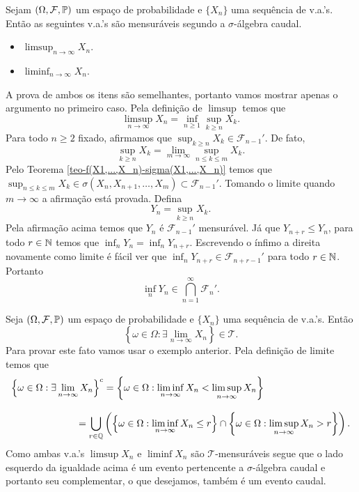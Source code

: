 \begin{exemplo}
	Sejam $(\Omega,\mathcal{F},\mathbb{P})$ um espaço de probabilidade e
	$\{X_n\}$ uma sequência de v.a.'s. Então as seguintes
	v.a.'s são mensuráveis segundo a $\sigma$-álgebra caudal. 
		\begin{itemize}
			\item 
			$\displaystyle \limsup_{n\to\infty} X_n$.
			
			\item
			$\displaystyle \liminf_{n\to\infty} X_n$.
		\end{itemize}		 

A prova de ambos os itens são semelhantes, portanto vamos 
mostrar apenas o argumento no primeiro caso.  
Pela definição de $\limsup$ temos que 
		\[
			\limsup_{n\to\infty} X_n
			=
			\inf_{n\geq 1} \sup_{k\geq n} X_k.
		\]
Para todo $n\geq 2$ fixado, 
afirmamos que $\sup_{k\geq n} X_k\in \mathcal{F}_{n-1}'$.
De fato,  
\[
	\sup_{k\geq n} X_k  
	= 
	\lim_{m\to\infty} \sup_{n\leq k\leq m} X_k.
\]
Pelo Teorema \ref{teo-f(X1,...,X_n)-sigma(X1,...,X_n)} 
temos que  
$\sup_{n\leq k\leq m} X_k
\in 
\sigma(X_n,X_{n+1},\ldots,X_{m})
\subset
\mathcal{F}_{n-1}'$.
Tomando o limite quando $m\to\infty$ a afirmação está provada. 
Defina 
	\[
		Y_{n} = \sup_{k\geq n} X_k.
	\]
Pela afirmação acima temos que $Y_n$ é $\mathcal{F}_{n-1}'$ mensurável.
Já que  $Y_{n+r}\leq Y_n$, para todo $r\in\mathbb{N}$ temos que 
$\inf_{n} Y_{n} = \inf_{n} Y_{n+r}$. Escrevendo o ínfimo 
a direita novamente como limite é fácil ver que 
$\inf_{n} Y_{n+r}\in \mathcal{F}_{n+r-1}'$ para todo 
$r\in\mathbb{N}$. Portanto 
	\[
		\inf_{n} Y_{n}\in 
		\bigcap_{n=1}^{\infty}
		\mathcal{F}_{n}'.
	\]
\end{exemplo}







\begin{exemplo}
	Seja $(\Omega,\mathcal{F},\mathbb{P})$ um espaço de probabilidade e
	$\{X_n\}$ uma sequência de v.a.'s. Então 
		\[
			\left\{
				\omega\in \Omega: 
				\exists \lim_{n\to\infty} X_n
			\right\}
			\in
			\mathcal{T}.
		\]
	Para provar este fato vamos usar o exemplo anterior.
	Pela definição de limite temos que 
	\begin{align*}
		\left\{
			\omega\in \Omega: 
			\exists \lim_{n\to\infty} X_n
		\right\}^c
		&=
		\left\{
			\omega\in \Omega: 
			\liminf_{n\to\infty} X_n 
			< 
			\limsup_{n\to\infty} X_n
		\right\}
		\\[0.3cm]
		&\hspace*{-1cm}=
		\bigcup_{r\in \Q}
		\left(		
		\left\{
			\omega\in \Omega: 
			\liminf_{n\to\infty} X_n 
			\leq r 
		\right\}
		\cap
		\left\{
			\omega\in \Omega: 
			\limsup_{n\to\infty} X_n 
			> r 
		\right\}
		\right).
	\end{align*}
Como ambas v.a.'s $\limsup X_n$ e $\liminf X_n$ são $\mathcal{T}$-mensuráveis
segue que o lado esquerdo da igualdade acima é um evento pertencente 
a $\sigma$-álgebra caudal e portanto seu complementar, o que desejamos,
também é um evento caudal.
\end{exemplo}





